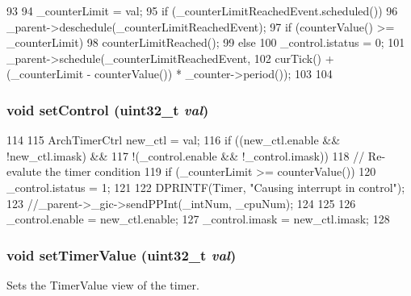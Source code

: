 \begin{DoxyCode}
93 {
94     _counterLimit = val;
95     if (_counterLimitReachedEvent.scheduled())
96         _parent->deschedule(_counterLimitReachedEvent);
97     if (counterValue() >= _counterLimit) {
98         counterLimitReached();
99     } else {
100         _control.istatus = 0;
101         _parent->schedule(_counterLimitReachedEvent,
102              curTick() + (_counterLimit - counterValue()) * _counter->period());
103     }
104 }
\end{DoxyCode}
\hypertarget{classGenericTimer_1_1ArchTimer_ab57ae80f8d45e22d44bd70e5e4655c1c}{
\subsubsection[{setControl}]{\setlength{\rightskip}{0pt plus 5cm}void setControl ({\bf uint32\_\-t} {\em val})}}
\label{classGenericTimer_1_1ArchTimer_ab57ae80f8d45e22d44bd70e5e4655c1c}



\begin{DoxyCode}
114 {
115     ArchTimerCtrl new_ctl = val;
116     if ((new_ctl.enable && !new_ctl.imask) &&
117         !(_control.enable && !_control.imask)) {
118         // Re-evalute the timer condition
119         if (_counterLimit >= counterValue()) {
120             _control.istatus = 1;
121 
122             DPRINTF(Timer, "Causing interrupt in control\n");
123             //_parent->_gic->sendPPInt(_intNum, _cpuNum);
124         }
125     }
126     _control.enable = new_ctl.enable;
127     _control.imask = new_ctl.imask;
128 }
\end{DoxyCode}
\hypertarget{classGenericTimer_1_1ArchTimer_ac19d12d53a8aa1e9296dde6d4755c854}{
\subsubsection[{setTimerValue}]{\setlength{\rightskip}{0pt plus 5cm}void setTimerValue ({\bf uint32\_\-t} {\em val})}}
\label{classGenericTimer_1_1ArchTimer_ac19d12d53a8aa1e9296dde6d4755c854}


Sets the TimerValue view of the timer. 


